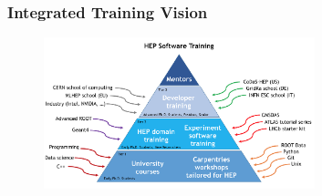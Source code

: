 \begin{frame}
\frametitle{Integrated Training Vision}

\begin{figure}[htbp]
\begin{center}
\includegraphics[width=0.7\textwidth]{images/Training-Pyramid.png}
\end{center}
\end{figure}

\end{frame}


